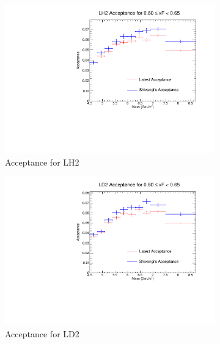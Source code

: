 \documentclass[11pt]{article}
\begin{document}
\begin{figure}[p]
    \centering
    \begin{subfigure}[b]{0.48\textwidth}
       \includegraphics[width=\linewidth]{./acceptancePlots/LH2_acceptance_xF_bin_12.pdf}
       \caption{Acceptance for LH2}
    \end{subfigure}\hfill
    \begin{subfigure}[b]{0.48\textwidth}
       \includegraphics[width=\linewidth]{./acceptancePlots/LD2_acceptance_xF_bin_12.pdf}
       \caption{Acceptance for LD2}
    \end{subfigure}
    \begin{subfigure}[b]{0.48\textwidth}

\end{subfigure}
\end{figure}
\end{document}
